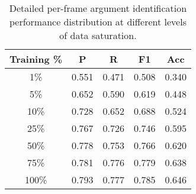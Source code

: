 \begin{table}
    \centering
    \begin{tabular}{ccccc}
        \hline
        \textbf{Training \%} & \textbf{P} & \textbf{R} & \textbf{F1} & \textbf{Acc} \\ 
        \hline
        1\%                 & 0.551 & 0.471 & 0.508 & 0.340 \\  
        5\%                 & 0.652 & 0.590 & 0.619 & 0.448 \\  
        10\%                & 0.728 & 0.652 & 0.688 & 0.524 \\  
        25\%                & 0.767 & 0.726 & 0.746 & 0.595 \\  
        50\%                & 0.778 & 0.753 & 0.766 & 0.620 \\  
        75\%                & 0.781 & 0.776 & 0.779 & 0.638 \\  
        100\%               & 0.793 & 0.777 & 0.785 & 0.646 \\  
        \hline
    \end{tabular}
    \caption{Detailed per-frame argument identification performance distribution at different levels of data saturation.}
    \label{tab:saturation}
\end{table}